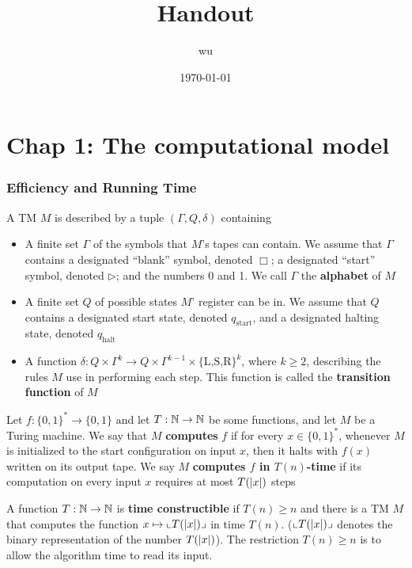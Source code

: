 \documentclass[11pt]{article}
\author{wu}
\date{\today}
\title{Handout}
\def \start {\text{start}}
\def \halt {\text{halt}}
\begin{document}
\maketitle
\section{Chap 1: The computational model}
\label{sec:org252a31f}

\subsubsection{Efficiency and Running Time}
\label{sec:orgcbb6aaa}
\begin{definition}[]
A TM \(M\) is described by a tuple \((\Gamma,Q,\delta)\) containing
\begin{itemize}
\item A finite set \(\Gamma\) of the symbols that \(M\)'s tapes can contain. We assume that \(\Gamma\) contains a
designated ``blank'' symbol, denoted \(\Box\); a designated ``start'' symbol, denoted \(\rhd\);
and the numbers 0 and 1. We call \(\Gamma\) the \textbf{alphabet} of \(M\)
\item A finite set \(Q\) of possible states \(M\)' register can be in. We assume that \(Q\) contains
a designated start state, denoted \(q_{\start}\), and a designated halting state, denoted \(q_{\halt}\)
\item A function \(\delta:Q\times\Gamma^k\to Q\times\Gamma^{k-1}\times\{\text{L,S,R}\}^k\),
where \(k\ge2\), describing the rules \(M\) use in performing each step. This function is
called the \textbf{transition function} of \(M\)
\end{itemize}
\end{definition}


\begin{definition}
Let \(f:\{0,1\}^*\to\{0,1\}\) and let \(T:\mathbb{N}\to\mathbb{N}\) be some functions, and let \(M\) be a Turing
machine. We say that \(M\) \textbf{computes} \(f\) if for every \(x\in\{0,1\}^*\), whenever \(M\) is
initialized to the start configuration on input \(x\), then it halts with \(f(x)\) written on
its output tape. We say \(M\) \textbf{computes \(f\) in \(T(n)\)-time} if its computation on every
input \(x\) requires at most \(T(\abs{x})\) steps
\end{definition}

A function \(T:\mathbb{N}\to\mathbb{N}\) is \textbf{time constructible} if \(T(n)\ge n\) and there is a TM \(M\) that
computes the function \(x\mapsto\lcorner{T(\abs{x})}\) in time \(T(n)\). (\(\lcorner{T(\abs{x})}\)
denotes the binary representation of the number \(T(\abs{x})\)). The restriction \(T(n)\ge n\) is
to allow the algorithm time to read its input.
\end{document}
